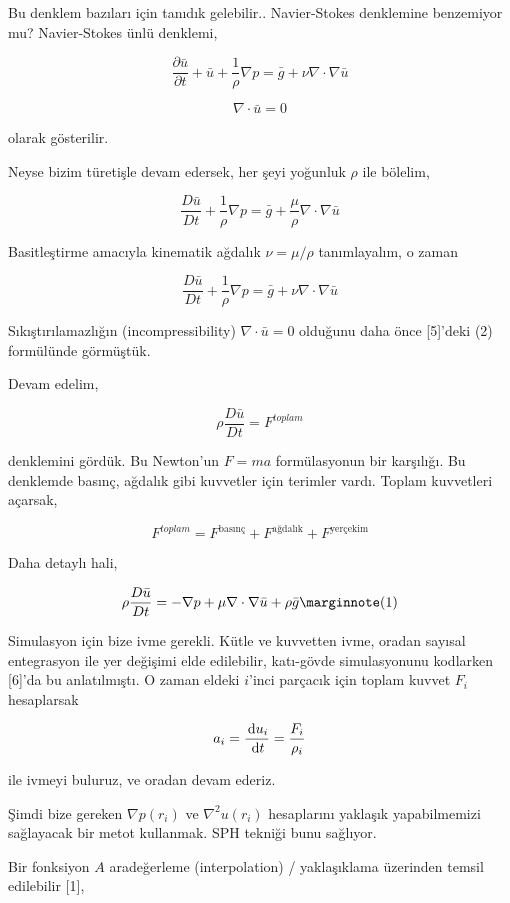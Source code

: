 \documentclass[12pt,fleqn]{article}\usepackage{../../common}
\begin{document}
Bu denklem bazıları için tanıdık gelebilir.. Navier-Stokes denklemine benzemiyor
mu? Navier-Stokes ünlü denklemi,

$$
\frac{\partial \bar{u}}{\partial t} + \bar{u} + \frac{1}{\rho} \nabla p =
\bar{g} + \nu \nabla \cdot \nabla \bar{u}
$$

$$
\nabla \cdot \bar{u} = 0
$$

olarak gösterilir.

Neyse bizim türetişle devam edersek, her şeyi yoğunluk $\rho$ ile bölelim,

$$
\frac{D \bar{u}}{D t} + \frac{1}{\rho} \nabla p =
\bar{g}  + \frac{\mu}{\rho} \nabla \cdot \nabla \bar{u}
$$

Basitleştirme amacıyla kinematik ağdalık $\nu = \mu / \rho$ tanımlayalım, o
zaman 

$$
\frac{D \bar{u}}{D t} + \frac{1}{\rho} \nabla p =
\bar{g}  + \nu \nabla \cdot \nabla \bar{u}
$$

Sıkıştırılamazlığın (incompressibility) $\nabla \cdot \bar{u} = 0$ olduğunu daha
önce [5]'deki (2) formülünde görmüştük.

Devam edelim,

$$
\rho \frac{D \bar{u}}{D t} = F^{toplam} 
$$

denklemini gördük. Bu Newton'un $F=ma$ formülasyonun bir karşılığı. Bu denklemde
basınç, ağdalık gibi kuvvetler için terimler vardı. Toplam kuvvetleri açarsak,

$$
F^{toplam}  = F^{\textrm{basınç}} + F^{\textrm{ağdalık}} + F^{\textrm{yerçekim}} 
$$

Daha detaylı hali,

$$
\rho \frac{D \bar{u}}{D t} = 
- \nabla p + \mu \nabla \cdot \nabla \bar{u} + \rho \bar{g}
\mlabel{1}
$$

Simulasyon için bize ivme gerekli. Kütle ve kuvvetten ivme, oradan sayısal
entegrasyon ile yer değişimi elde edilebilir, katı-gövde simulasyonunu kodlarken
[6]'da bu anlatılmıştı. O zaman eldeki $i$'inci parçacık için toplam kuvvet
$F_i$ hesaplarsak

$$
a_i = \frac{\,\mathrm{d} u_i}{\,\mathrm{d} t} = \frac{F_i}{\rho_i}
$$

ile ivmeyi buluruz, ve oradan devam ederiz.

Şimdi bize gereken $\nabla p(r_i)$ ve $\nabla^2 u(r_i)$ hesaplarını yaklaşık
yapabilmemizi sağlayacak bir metot kullanmak. SPH tekniği bunu sağlıyor.

Bir fonksiyon $A$ aradeğerleme (interpolation) / yaklaşıklama üzerinden temsil
edilebilir [1],
\end{document}
